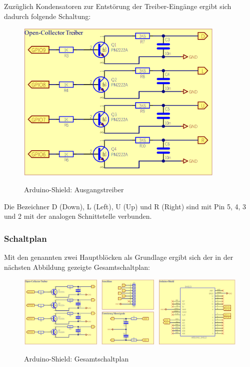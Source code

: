 Zuzüglich Kondensatoren zur Entstörung der Treiber-Eingänge ergibt sich dadurch folgende Schaltung:

\begin{figure}[H]
	\centering
	\includegraphics[width=10cm]{../ref/SchematicAusgangstreiberGS232.png}
	\label{fig:Schaltung_Ausgangstreiber_Arduino-Shield}
	\caption{Arduino-Shield: Ausgangstreiber}
\end{figure}

Die Bezeichner D (Down), L (Left), U (Up) und R (Right) sind mit Pin 5, 4, 3 und 2 mit der analogen Schnittstelle verbunden.

\subsubsection{Schaltplan}
Mit den genannten zwei Hauptblöcken als Grundlage ergibt sich der in der nächsten Abbildung gezeigte Gesamtschaltplan:
\begin{figure}[H]
	\centering
	\includegraphics[width=\linewidth]{../ref/SchematicFullGS232.png}
	\label{fig:Schaltung__Arduino-Shield}
	\caption{Arduino-Shield: Gesamtschaltplan}
\end{figure}

